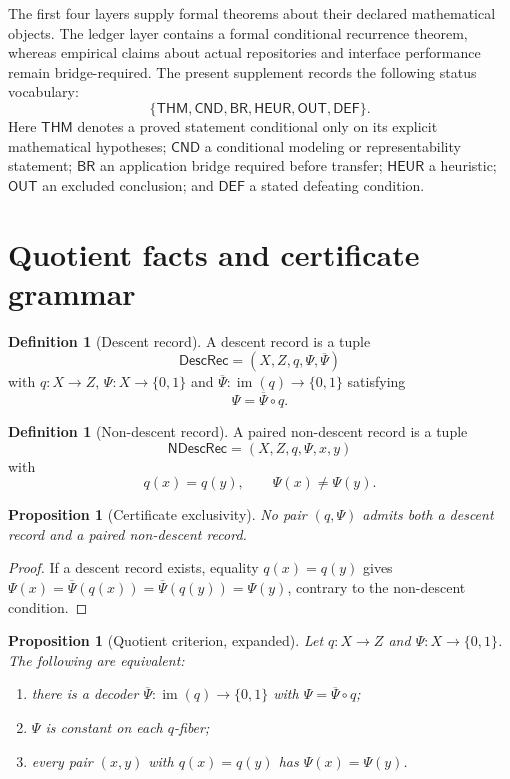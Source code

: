 \documentclass[11pt]{article}
\newcommand{\Bbits}{\ensuremath{\{0,1\}}}
\newcommand{\im}{\ensuremath{\operatorname{im}}}
\theoremstyle{plain}
\newtheorem{proposition}[theorem]{Proposition}
\theoremstyle{definition}
\newtheorem{definition}[theorem]{Definition}
\theoremstyle{remark}
\begin{document}
The first four layers supply formal theorems about their declared mathematical
objects.  The ledger layer contains a formal conditional recurrence theorem,
whereas empirical claims about actual repositories and interface performance
remain bridge-required.  The present supplement records the following status
vocabulary:
\[
\{\mathsf{THM},\mathsf{CND},\mathsf{BR},\mathsf{HEUR},\mathsf{OUT},\mathsf{DEF}\}.
\]
Here $\mathsf{THM}$ denotes a proved statement conditional only on its explicit
mathematical hypotheses; $\mathsf{CND}$ a conditional modeling or
representability statement; $\mathsf{BR}$ an application bridge required before
transfer; $\mathsf{HEUR}$ a heuristic; $\mathsf{OUT}$ an excluded conclusion; and
$\mathsf{DEF}$ a stated defeating condition.

\section{Quotient facts and certificate grammar}
\label{sec:quotient}

\begin{definition}[Descent record]
A descent record is a tuple
\[
\mathsf{DescRec}=(X,Z,q,\Psi,\overline\Psi)
\]
with $q:X\to Z$, $\Psi:X\to\Bbits$ and
$\overline\Psi:\im(q)\to\Bbits$ satisfying
\[
\Psi=\overline\Psi\circ q.
\]
\end{definition}

\begin{definition}[Non-descent record]
A paired non-descent record is a tuple
\[
\mathsf{NDescRec}=(X,Z,q,\Psi,x,y)
\]
with
\[
q(x)=q(y),\qquad\Psi(x)\neq\Psi(y).
\]
\end{definition}

\begin{proposition}[Certificate exclusivity]
No pair $(q,\Psi)$ admits both a descent record and a paired non-descent record.
\end{proposition}

\begin{proof}
If a descent record exists, equality $q(x)=q(y)$ gives
$\Psi(x)=\overline\Psi(q(x))=\overline\Psi(q(y))=\Psi(y)$, contrary to the
non-descent condition.
\end{proof}

\begin{proposition}[Quotient criterion, expanded]
\label{prop:fiber-expanded}
Let $q:X\to Z$ and $\Psi:X\to\Bbits$.  The following are equivalent:
\begin{enumerate}[label=\textnormal{(\roman*)},leftmargin=2.6em]
\item there is a decoder $\overline\Psi:\im(q)\to\Bbits$ with
$\Psi=\overline\Psi\circ q$;
\item $\Psi$ is constant on each $q$-fiber;
\item every pair $(x,y)$ with $q(x)=q(y)$ has $\Psi(x)=\Psi(y)$.
\end{enumerate}
\end{proposition}
\end{document}
